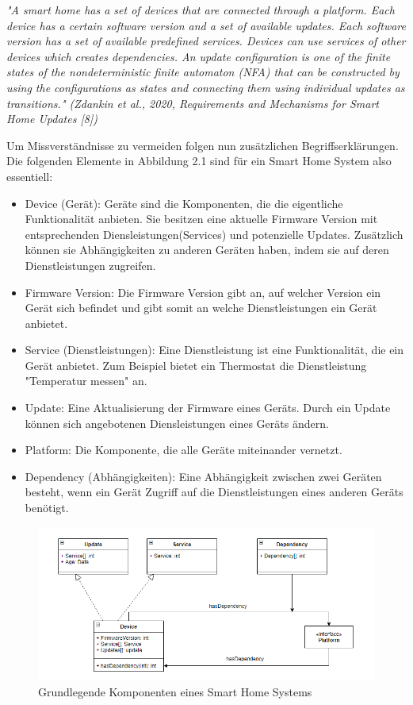 \par
\begingroup
\leftskip=1cm %
\noindent %
\textit{"A smart home has a set of devices that are connected through
a platform. Each device has a certain software version and
a set of available updates. Each software version has a set
of available predefined services. Devices can use services of
other devices which creates dependencies. An update configuration
is one of the finite states of the nondeterministic
finite automaton (NFA) that can be constructed by using the
configurations as states and connecting them using individual
updates as transitions." (Zdankin et al., 2020, Requirements and Mechanisms for Smart Home Updates [8])}
\par
\endgroup
Um Missverständnisse zu vermeiden folgen nun zusätzlichen Begriffserklärungen.
Die folgenden Elemente in Abbildung 2.1 sind für ein Smart Home System also essentiell:
\begin{itemize}
\item Device (Gerät): Geräte sind die Komponenten, die die eigentliche Funktionalität anbieten. Sie besitzen eine aktuelle Firmware
Version mit entsprechenden Diensleistungen(Services) und potenzielle Updates. Zusätzlich können sie Abhängigkeiten zu anderen Geräten haben, indem sie auf deren
Dienstleistungen zugreifen.
\item Firmware Version: Die Firmware Version gibt an, auf welcher Version ein Gerät sich befindet und gibt somit an welche Dienstleistungen ein Gerät anbietet.
\item Service (Dienstleistungen): Eine Dienstleistung ist eine Funktionalität, die ein Gerät anbietet. Zum Beispiel bietet ein Thermostat
die Dienstleistung "Temperatur messen" an.
\item Update: Eine Aktualisierung der Firmware eines Geräts. Durch ein Update können sich angebotenen Diensleistungen eines Geräts ändern.
\item Platform: Die Komponente, die alle Geräte miteinander vernetzt.
\item Dependency (Abhängigkeiten): Eine Abhängigkeit zwischen zwei Geräten besteht, wenn ein Gerät Zugriff auf die Dienstleistungen eines
anderen Geräts benötigt.
\end{itemize}

\begin{figure}[!ht]
\hspace*{-2,5cm}                                                           
\includegraphics{"System Model"}
  \caption{Grundlegende Komponenten eines Smart Home Systems}
  \label{fig:Prob1:MEA}
\end{figure}


